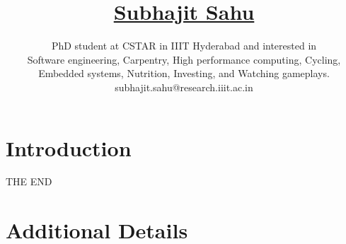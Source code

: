 \documentclass[11pt]{article}
\title{
  \vspace{-6ex}
  \href{https://wolfram77.github.io/}{Subhajit Sahu}
  \vspace{-4ex}
}
\author{
  PhD student at CSTAR in IIIT Hyderabad and interested in \\
  Software engineering, Carpentry, High performance computing, Cycling, \\
  Embedded systems, Nutrition, Investing, and Watching gameplays. \\
  {\small subhajit.sahu@research.iiit.ac.in}
}
\date{}
\begin{document}
\maketitle
\vspace{-9ex}

\section{Introduction}
\label{sec:introduction}




% 

\newpage
\begin{center}
\vspace*{\fill}
THE END
\vspace*{\fill}
\end{center}

\newpage
\section{Additional Details}


\newpage
\appendix
\small


\end{document}
